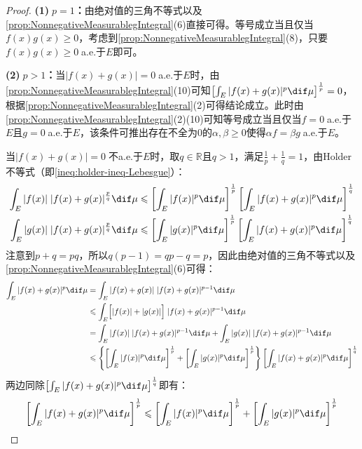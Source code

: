 \begin{proof}
	\textbf{(1)$\;p=1$：}由绝对值的三角不等式以及\cref{prop:NonnegativeMeasurablegIntegral}(6)直接可得。等号成立当且仅当$f(x)g(x)\geqslant0$，考虑到\cref{prop:NonnegativeMeasurablegIntegral}(8)，只要$f(x)g(x)\geqslant0\;$a.e.于$E$即可。\par
	\textbf{(2)$\;p>1$：}当$|f(x)+g(x)|=0\;$a.e.于$E$时，由\cref{prop:NonnegativeMeasurablegIntegral}(10)可知$\left[\int_{E}^{}|f(x)+g(x)|^p\dif\mu\right]^\frac{1}{p}=0$，根据\cref{prop:NonnegativeMeasurablegIntegral}(2)可得结论成立。此时由\cref{prop:NonnegativeMeasurablegIntegral}(2)(10)可知等号成立当且仅当$f=0\;$a.e.于$E$且$g=0\;$a.e.于$E$，该条件可推出存在不全为$0$的$\alpha,\beta\geqslant0$使得$\alpha f=\beta g\;$a.e.于$E$。\par
	当$|f(x)+g(x)|=0\;$不a.e.于$E$时，取$q\in\mathbb{R}$且$q>1$，满足$\frac{1}{p}+\frac{1}{q}=1$，由Holder不等式（即\cref{ineq:holder-ineq-Lebesgue}）：
	\begin{gather*}
		\int_{E}^{}|f(x)|\;|f(x)+g(x)|^\frac{p}{q}\dif\mu\leqslant\left[\int_{E}^{}|f(x)|^p\dif\mu\right]^\frac{1}{p}\left[\int_{E}^{}|f(x)+g(x)|^p\dif\mu\right]^\frac{1}{q} \\
		\int_{E}^{}|g(x)|\;|f(x)+g(x)|^\frac{p}{q}\dif\mu\leqslant\left[\int_{E}^{}|g(x)|^p\dif\mu\right]^\frac{1}{p}\left[\int_{E}^{}|f(x)+g(x)|^p\dif\mu\right]^\frac{1}{q}
	\end{gather*}
	注意到$p+q=pq$，所以$q(p-1)=qp-q=p$，因此由绝对值的三角不等式以及\cref{prop:NonnegativeMeasurablegIntegral}(6)可得：
	\begin{align*}
		\int_{E}^{}|f(x)+g(x)|^p\dif\mu
		&=\int_{E}^{}|f(x)+g(x)|\;|f(x)+g(x)|^{p-1}\dif\mu \\
		&\leqslant\int_{E}^{}\Bigl[|f(x)|+|g(x)|\Bigr]\;|f(x)+g(x)|^{p-1}\dif\mu \\
		&=\int_{E}^{}|f(x)|\;|f(x)+g(x)|^{p-1}\dif\mu+\int_{E}^{}|g(x)|\;|f(x)+g(x)|^{p-1}\dif\mu \\
		&\leqslant\left\{\left[\int_{E}^{}|f(x)|^p\dif\mu\right]^\frac{1}{p}+\left[\int_{E}^{}|g(x)|^p\dif\mu\right]^\frac{1}{p}\right\}\left[\int_{E}^{}|f(x)+g(x)|^p\dif\mu\right]^\frac{1}{q}
	\end{align*}
	两边同除$\left[\int_{E}^{}|f(x)+g(x)|^p\dif\mu\right]^\frac{1}{q}$即有：
	\begin{equation*}
			\left[\int_{E}^{}|f(x)+g(x)|^p\dif\mu\right]^\frac{1}{p}\leqslant\left[\int_{E}^{}|f(x)|^p\dif\mu\right]^\frac{1}{p}+\left[\int_{E}^{}|g(x)|^p\dif\mu\right]^\frac{1}{p}
	\end{equation*}

\end{proof}

